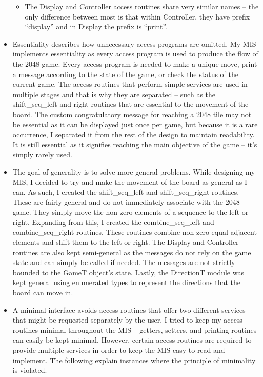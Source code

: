 \documentclass[12pt]{article}
\begin{document}
\begin{itemize}
\begin{itemize}
        \item The Display and Controller access routines share very similar names – the only difference between most is that within Controller, they have prefix “display” and in Display the prefix is “print”.
    \end{itemize}
    \item Essentiality describes how unnecessary access programs are omitted. My MIS implements essentiality as every access program is used to produce the flow of the 2048 game. Every access program is needed to make a unique move, print a message according to the state of the game, or check the status of the current game. The access routines that perform simple services are used in multiple stages and that is why they are separated – such as the shift\_seq\_left and right routines that are essential to the movement of the board. The custom congratulatory message for reaching a 2048 tile may not be essential as it can be displayed just once per game, but because it is a rare occurrence, I separated it from the rest of the design to maintain readability. It is still essential as it signifies reaching the main objective of the game – it’s simply rarely used.
    \item The goal of generality is to solve more general problems. While designing my MIS, I decided to try and make the movement of the board as general as I can. As such, I created the shift\_seq\_left and shift\_seq\_right routines. These are fairly general and do not immediately associate with the 2048 game. They simply move the non-zero elements of a sequence to the left or right. Expanding from this, I created the combine\_seq\_left and combine\_seq\_right routines. These routines combine non-zero equal adjacent elements and shift them to the left or right. The Display and Controller routines are also kept semi-general as the messages do not rely on the game state and can simply be called if needed. The messages are not strictly bounded to the GameT object’s state. Lastly, the DirectionT module was kept general using enumerated types to represent the directions that the board can move in.
    \item A minimal interface avoids access routines that offer two different services that might be requested separately by the user. I tried to keep my access routines minimal throughout the MIS – getters, setters, and printing routines can easily be kept minimal. However, certain access routines are required to provide multiple services in order to keep the MIS easy to read and implement. The following explain instances where the principle of minimality is violated.

\end{itemize}
\end{document}
